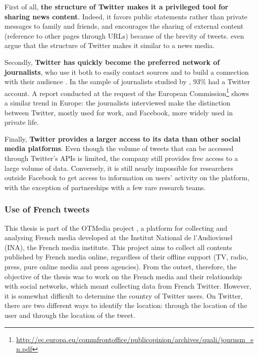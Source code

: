	
	First of all, \textbf{the structure of Twitter makes it a privileged tool for sharing news content}. Indeed, it favors public statements rather than private messages to family and friends, and encourages the sharing of external content (reference to other pages through URLs) because of the brevity of tweets. \citet{kwak_twitter_2010} even argue that the structure of Twitter makes it similar to a news media.
	
	
	Secondly, \textbf{Twitter has quickly become the preferred network of journalists}, who use it both to easily contact sources and to build a connection with their audience \citep{swasy_little_2016}. In the sample of journalists studied by \citet{mcgregor_twitter_2018}, 93\% had a Twitter account. A report conducted at the request of the European Commission\footnote{\url{http://ec.europa.eu/commfrontoffice/publicopinion/archives/quali/journsm_en.pdf}} shows a similar trend in Europe: the journalists interviewed make the distinction between Twitter, mostly used for work, and Facebook, more widely used in private life.
	
	
	Finally, \textbf{Twitter provides a larger access to its data than other social media platforms}. Even though the volume of tweets that can be accessed through Twitter's APIs is limited, the company still provides free access to a large volume of data. Conversely, it is still nearly
impossible for researchers outside Facebook to get access to information on users' activity on the platform, with the exception of partnerships with a few rare research teams.

\subsubsection{Use of French tweets}

This thesis is part of the OTMedia project \citep{herve2019otmedia}, a platform for collecting and analysing French media developed at the Institut National de l'Audiovisuel (INA), the French media institute. This project aims to collect all contents published by French media online, regardless of their offline support (TV, radio, press, pure online media and press agencies). From the outset, therefore, the objective of the thesis was to work on the French media and their relationship with social networks, which meant collecting data from French Twitter. However, it is somewhat difficult to determine the country of Twitter users. On Twitter, there are two different ways to identify the location: through the location of the user and through the location of the tweet. 

